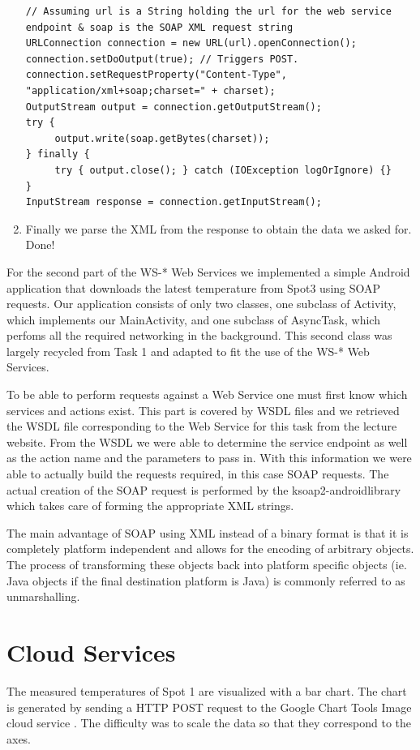 \documentclass{report}
\begin{document}
\begin{enumerate}
	\begin{lstlisting}
// Assuming url is a String holding the url for the web service endpoint & soap is the SOAP XML request string
URLConnection connection = new URL(url).openConnection();
connection.setDoOutput(true); // Triggers POST.
connection.setRequestProperty("Content-Type", "application/xml+soap;charset=" + charset);
OutputStream output = connection.getOutputStream();
try {
     output.write(soap.getBytes(charset));
} finally {
     try { output.close(); } catch (IOException logOrIgnore) {}
}
InputStream response = connection.getInputStream();
	\end{lstlisting}
	\item Finally we parse the XML from the response to obtain the data we asked for. Done!
\end{enumerate}


For the second part of the WS\hbox{-}* Web Services we implemented a simple Android application that downloads the latest temperature from Spot3 using SOAP requests. Our application consists of only two classes, one subclass of Activity, which implements our MainActivity, and one subclass of AsyncTask, which perfoms all the required networking in the background. This second class was largely recycled from Task 1 and adapted to fit the use of the WS\hbox{-}* Web Services.

To be able to perform requests against a Web Service one must first know which services and actions exist. This part is covered by WSDL files and we retrieved the WSDL file corresponding to the Web Service for this task from the lecture website. From the WSDL we were able to determine the service endpoint as well as the action name and the parameters to pass in. With this information we were able to actually build the requests required, in this case SOAP requests. The actual creation of the SOAP request is performed by the ksoap2-androidlibrary\cite{ksoap2} which takes care of forming the appropriate XML strings.

The main advantage of SOAP using XML instead of a binary format is that it is completely platform independent and allows for the encoding of arbitrary objects. The process of transforming these objects back into platform specific objects (ie. Java objects if the final destination platform is Java) is commonly referred to as unmarshalling.

\section{Cloud Services}
The measured temperatures of Spot 1 are visualized with a bar chart. The chart is generated by sending a HTTP POST request to the Google Chart Tools Image cloud service \cite{googleChart}. The difficulty was to scale the data so that they correspond to the axes.
\end{document}
